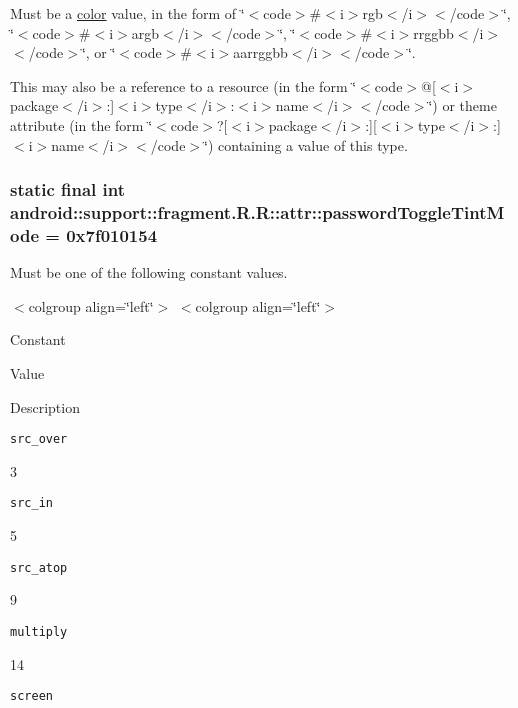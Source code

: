 Must be a \hyperlink{classandroid_1_1support_1_1fragment_1_1_r_1_1color}{color} value, in the form of \char`\"{}$<$code$>$\#$<$i$>$rgb$<$/i$>$$<$/code$>$\char`\"{}, \char`\"{}$<$code$>$\#$<$i$>$argb$<$/i$>$$<$/code$>$\char`\"{}, \char`\"{}$<$code$>$\#$<$i$>$rrggbb$<$/i$>$$<$/code$>$\char`\"{}, or \char`\"{}$<$code$>$\#$<$i$>$aarrggbb$<$/i$>$$<$/code$>$\char`\"{}. 

This may also be a reference to a resource (in the form \char`\"{}$<$code$>$@\mbox{[}$<$i$>$package$<$/i$>$:\mbox{]}$<$i$>$type$<$/i$>$:$<$i$>$name$<$/i$>$$<$/code$>$\char`\"{}) or theme attribute (in the form \char`\"{}$<$code$>$?\mbox{[}$<$i$>$package$<$/i$>$:\mbox{]}\mbox{[}$<$i$>$type$<$/i$>$:\mbox{]}$<$i$>$name$<$/i$>$$<$/code$>$\char`\"{}) containing a value of this type. \hypertarget{classandroid_1_1support_1_1fragment_1_1_r_1_1attr_cb5369f7bd5819b14312d005dfe6ce0f}{
\subsubsection[{passwordToggleTintMode}]{\setlength{\rightskip}{0pt plus 5cm}static final int android::support::fragment.R.R::attr::passwordToggleTintMode = 0x7f010154}}
\label{classandroid_1_1support_1_1fragment_1_1_r_1_1attr_cb5369f7bd5819b14312d005dfe6ce0f}


Must be one of the following constant values. \begin{TabularC}{0}
\hline
\end{TabularC}
$<$colgroup align=\char`\"{}left\char`\"{}$>$ $<$colgroup align=\char`\"{}left\char`\"{}$>$ 

Constant

Value

Description 

{\tt src\_\-over}

3

{\tt src\_\-in}

5

{\tt src\_\-atop}

9

{\tt multiply}

14

{\tt screen}

